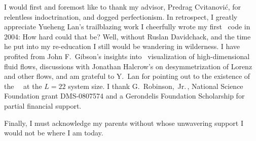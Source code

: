 
I would first and foremost like to thank my advisor, Predrag Cvitanovi\'c,
for
	          {relentless indoctrination},
and dogged perfectionism.
In retrospect, I greatly appreciate Yueheng Lan's trailblazing
work
I cheerfully wrote my first \KS\ code in 2004: How hard could
that be?
%
Well, without Ruslan Davidchack, and the time he put into my
re-education I still would be wandering in wilderness.
I have
profited from John F.~Gibson's insights into \statesp\
visualization of high-dimensional fluid flows,
discussions with
Jonathan Halcrow's on desymmetrization of Lorenz and other
flows,
and
am grateful to Y.~Lan for pointing out to the
existence of the ~\eqv\ at the $L=22$ system size.
I thank
G.~Robinson,~Jr.\,, National Science Foundation grant
DMS-0807574 and a Gerondelis Foundation Scholarship
for partial financial support.

Finally, I must acknowledge my parents without whose unwavering support
I would not be where I am today.
%

